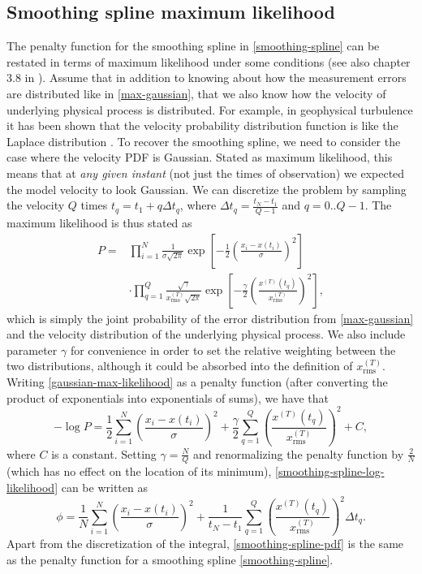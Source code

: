 \documentclass{ametsoc}
\begin{document}
\subsection{Smoothing spline maximum likelihood}
\label{sec:maximum_likelihood}

The penalty function for the smoothing spline in \eqref{smoothing-spline} can be restated in terms of maximum likelihood under some conditions (see also chapter 3.8 in \citet{green1994-book}). Assume that in addition to knowing about how the measurement errors are distributed like in \eqref{max-gaussian}, that we also know how the velocity of underlying physical process is distributed. For example, in geophysical turbulence it has been shown that the velocity probability distribution function is like the Laplace distribution \citep{bracco2000-pf}. To recover the smoothing spline, we need to consider the case where the velocity PDF is Gaussian. Stated as maximum likelihood, this means that at \emph{any given instant} (not just the times of observation) we expected the model velocity to look Gaussian. We can discretize the problem by sampling the velocity $Q$ times $t_q = t_1 + q \Delta t_q$, where $\Delta t_q=\frac{t_N-t_1}{Q-1}$ and $q=0..Q-1$. The maximum likelihood is thus stated as
\begin{align}
P =  & \prod^N _{i=1}\frac{1}{\sigma \sqrt{2 \pi}}\exp \left[ -\frac{1}{2} \left( \frac{x_i - x(t_i)}{\sigma} \right)^2 \right] \nonumber \\ &  \cdot  \prod^{Q}_{q=1}\frac{\sqrt{\gamma}}{x^{(T)}_{\textrm{rms}} \sqrt{2 \pi}} \exp \left[  - \frac{\gamma}{2} \left(  \frac{x^{(T)}(t_q)}{x^{(T)}_{\textrm{rms}}} \right)^2 \right],
\label{gaussian-max-likelihood}
\end{align}
which is simply the joint probability of the error distribution from \eqref{max-gaussian} and the velocity distribution of the underlying physical process. We also include parameter $\gamma$ for convenience in order to set the relative weighting between the two distributions, although it could be absorbed into the definition of $x^{(T)}_{\textrm{rms}}$. Writing \eqref{gaussian-max-likelihood} as a penalty function (after converting the product of exponentials into exponentials of sums), we have that
\begin{equation}
-\log P= \frac{1}{2}\sum^N _{i=1}  \left( \frac{x_i - x(t_i)}{\sigma} \right)^2 + \frac{\gamma}{2} \sum^{Q}_{q=1} \left( \frac{x^{(T)}(t_q)}{x^{(T)}_{\textrm{rms}}} \right)^2 + C,
\label{smoothing-spline-log-likelihood}
\end{equation}
where $C$ is a constant. Setting $\gamma=\frac{N}{Q}$ and renormalizing the penalty function by $\frac{2}{N}$ (which has no effect on the location of its minimum), \eqref{smoothing-spline-log-likelihood} can be written as
\begin{equation}
\label{smoothing-spline-pdf}
\phi = \frac{1}{N} \sum^N _{i=1}  \left( \frac{x_i - x(t_i)}{\sigma} \right)^2 + \frac{1}{t_N-t_1} \sum^{Q}_{q=1}  \left(  \frac{x^{(T)}(t_q)}{x^{(T)}_{\textrm{rms}}} \right)^2 \Delta t_q.
\end{equation}
Apart from the discretization of the integral, \eqref{smoothing-spline-pdf} is the same as the penalty function for a smoothing spline \eqref{smoothing-spline}.
\end{document}
